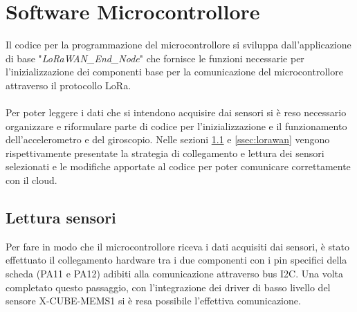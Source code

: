 \section{Software Microcontrollore}
Il codice per la programmazione del microcontrollore si sviluppa dall'applicazione di base "\textit{LoRaWAN\_End\_Node}" che fornisce
le funzioni necessarie per l'inizializzazione dei componenti base per la comunicazione del microcontrollore attraverso il protocollo LoRa.
\\\\Per poter leggere i dati che si intendono acquisire dai sensori si è reso necessario organizzare e riformulare parte di codice per l'inizializzazione e il funzionamento dell'accelerometro
e del giroscopio. Nelle sezioni \ref{ssec:sensori} e \ref{ssec:lorawan} vengono rispettivamente presentate la strategia di collegamento e lettura dei sensori selezionati e 
le modifiche apportate al codice per poter comunicare correttamente con il cloud.

\subsection{Lettura sensori}\label{ssec:sensori}
Per fare in modo che il microcontrollore riceva i dati acquisiti dai sensori, è stato effettuato il collegamento hardware tra i due componenti con i pin specifici della scheda (PA11 e PA12) 
adibiti alla comunicazione attraverso bus I2C. Una volta completato questo passaggio, con l'integrazione dei driver di basso livello del sensore X-CUBE-MEMS1 si è resa possibile l'effettiva comunicazione.\\


